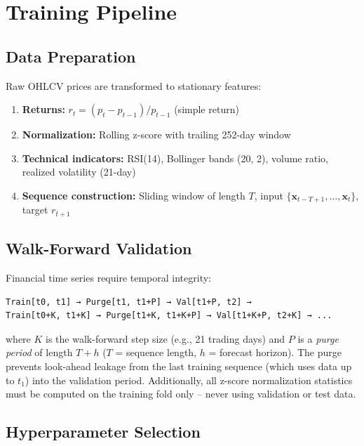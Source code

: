 \documentclass[11pt,a4paper]{article}
\begin{document}
\section{Training Pipeline}

\subsection{Data Preparation}

Raw OHLCV prices are transformed to stationary features:

\begin{enumerate}
  \item \textbf{Returns:} $r_t = (p_t - p_{t-1}) / p_{t-1}$ (simple return)
  \item \textbf{Normalization:} Rolling z-score with trailing 252-day window
  \item \textbf{Technical indicators:} RSI(14), Bollinger bands (20, 2),
    volume ratio, realized volatility (21-day)
  \item \textbf{Sequence construction:} Sliding window of length $T$,
    input $\{\mathbf{x}_{t-T+1}, \ldots, \mathbf{x}_t\}$, target $r_{t+1}$
\end{enumerate}

\subsection{Walk-Forward Validation}

Financial time series require temporal integrity:
\begin{verbatim}
Train[t0, t1] → Purge[t1, t1+P] → Val[t1+P, t2] →
Train[t0+K, t1+K] → Purge[t1+K, t1+K+P] → Val[t1+K+P, t2+K] → ...
\end{verbatim}
where $K$ is the walk-forward step size (e.g., 21 trading days) and $P$ is a
\emph{purge period} of length $T + h$ ($T$ = sequence length, $h$ = forecast
horizon). The purge prevents look-ahead leakage from the last training sequence
(which uses data up to $t_1$) into the validation period. Additionally, all
z-score normalization statistics must be computed on the training fold only --
never using validation or test data.

\subsection{Hyperparameter Selection}
\end{document}
